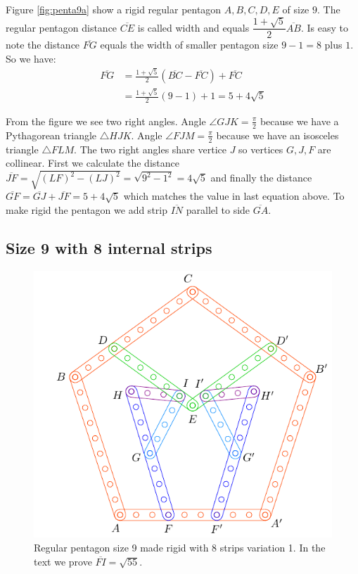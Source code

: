 \documentclass[11pt]{article}
\begin{document}
Figure \ref{fig:penta9a} show a rigid regular pentagon $A,B,C,D,E$ of size $9$. The regular pentagon distance $\overline{CE}$ is called width and equals $\dfrac{1+\sqrt5}{2}\overline{AB}$. Is easy to note the distance $\overline{FG}$ equals the width of smaller pentagon size $9-1=8$ plus $1$. So we have:
\begin{align}
\overline{FG} &= \frac{1+\sqrt5}{2}(\overline{BC}-\overline{FC}) + \overline{FC}\nonumber\\
 &= \frac{1+\sqrt5}{2}(9-1) + 1 = 5 + 4\sqrt5
\end{align}

From the figure we see two right angles. Angle $\angle{GJK}=\frac{\pi}2$ because we have a Pythagorean triangle $\triangle{HJK}$. Angle $\angle{FJM}=\frac{\pi}2$ because we have an isosceles triangle $\triangle{FLM}$. The two right angles share vertice $J$ so vertices $G,J,F$ are collinear. First we calculate the distance $\overline{JF} = \sqrt{(LF)^2 - (LJ)^2} = \sqrt{9^2-1^2} = 4\sqrt5$ and finally the distance $\overline{GF} = \overline{GJ} + \overline{JF} = 5 + 4\sqrt5$ which matches the value in last equation above. To make rigid the pentagon we add strip $\overline{IN}$ parallel to side $\overline{GA}$.

\subsection{Size 9 with 8 internal strips}

\begin{figure}[H]
 \centering
 \includegraphics[scale=0.95]{9/penta9-8a}
 \caption{Regular pentagon size 9 made rigid with 8 strips variation 1. In the text we prove $\overline{FI} = \sqrt{55}$.}
 \label{fig:penta9-8a}
\end{figure}
\end{document}
